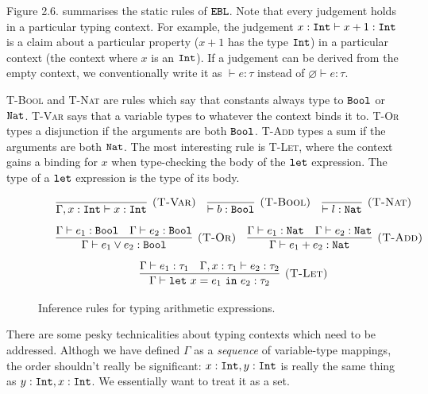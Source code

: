 Figure 2.6. summarises the static rules of $\mathtt{EBL}$. Note that every judgement holds in a particular typing context. For example, the judgement $x: \mathtt{Int} \vdash x + 1: \mathtt{Int}$ is a claim about a particular property ($x+1$ has the type $\mathtt{Int}$) in a particular context (the context where $x$ is an $\mathtt{Int}$). If a judgement can be derived from the empty context, we conventionally write it as $\vdash e: \tau$ instead of $\varnothing \vdash e: \tau$.

\textsc{T-Bool} and \textsc{T-Nat} are rules which say that constants always type to $\mathtt{Bool}$ or $\mathtt{Nat}$. \textsc{T-Var} says that a variable types to whatever the context binds it to. \textsc{T-Or} types a disjunction if the arguments are both $\mathtt{Bool}$. \textsc{T-Add} types a sum if the arguments are both $\mathtt{Nat}$. The most interesting rule is \textsc{T-Let}, where the context gains a binding for $x$ when type-checking the body of the $\mathtt{let}$ expression. The type of a $\mathtt{let}$ expression is the type of its body.

\begin{figure}[h]

\noindent
{}

\[
\begin{array}{c}

\infer[\textsc{(T-Var)}]
	{\Gamma, x: \kwa{Int} \vdash x: \kwa{Int}}
	{}
~~~
\infer[\textsc{(T-Bool)}]
	{\vdash b : \Bool}
	{}
	~~~
\infer[\textsc{(T-Nat)}]
	{\vdash l : \Nat}
	{}\\[2ex]

	~~~
\infer[\textsc{(T-Or)}]
	{\Gamma \vdash e_1 \lor e_2 : \Bool}
	{\Gamma \vdash e_1: \Bool & \Gamma \vdash e_2: \Bool}
	~~~
\infer[\textsc{(T-Add)}]
	{\Gamma \vdash e_1 + e_2 : \Nat}
	{\Gamma \vdash e_1: \Nat & \Gamma \vdash e_2: \Nat} \\[2ex]
	
\infer[\textsc{(T-Let)}]
	{\Gamma \vdash \letxpr{x}{e_1}{e_2} : \tau_2}
	{\Gamma \vdash e_1: \tau_1 & \Gamma, x: \tau_1 \vdash e_2: \tau_2}
	
	
\end{array}
\]

\vspace{-12pt}
\caption{Inference rules for typing arithmetic expressions.}
\label{A sample. }
\end{figure}

There are some pesky technicalities about typing contexts which need to be addressed. Althogh we have defined $\Gamma$ as a \textit{sequence} of variable-type mappings, the order shouldn't really be significant: $x: \mathtt{Int}, y: \mathtt{Int}$ is really the same thing as $y: \mathtt{Int}, x: \mathtt{Int}$. We essentially want to treat it as a set.

